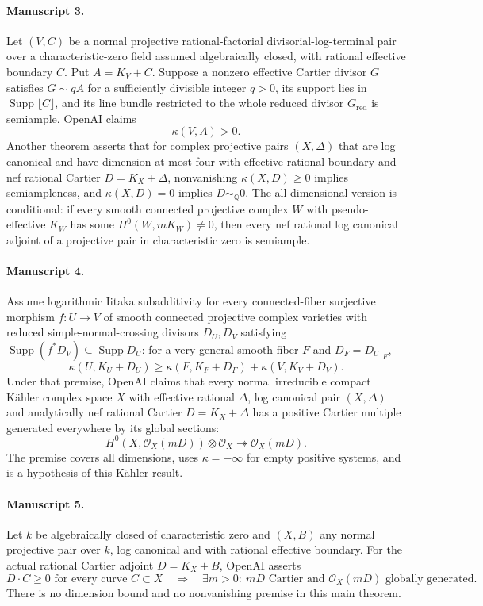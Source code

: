\documentclass[11pt]{article}
\begin{document}
\paragraph{Manuscript 3.}
Let $(V,C)$ be a normal projective rational-factorial divisorial-log-terminal pair over a characteristic-zero field assumed algebraically closed, with rational effective boundary $C$. Put $A=K_V+C$. Suppose a nonzero effective Cartier divisor $G$ satisfies $G\sim qA$ for a sufficiently divisible integer $q>0$, its support lies in $\operatorname{Supp}\lfloor C\rfloor$, and its line bundle restricted to the whole reduced divisor $G_{\mathrm{red}}$ is semiample. OpenAI claims
\[
\kappa(V,A)>0.
\]
Another theorem asserts that for complex projective pairs $(X,\Delta)$ that are log canonical and have dimension at most four with effective rational boundary and nef rational Cartier $D=K_X+\Delta$, nonvanishing $\kappa(X,D)\ge0$ implies semiampleness, and $\kappa(X,D)=0$ implies $D\sim_{\mathbb Q}0$.
The all-dimensional version is conditional: if every smooth connected projective complex $W$ with pseudo-effective $K_W$ has some $H^0(W,mK_W)\ne0$, then every nef rational log canonical adjoint of a projective pair in characteristic zero is semiample.

\paragraph{Manuscript 4.}
Assume logarithmic Iitaka subadditivity for every connected-fiber surjective morphism $f:U\to V$ of smooth connected projective complex varieties with reduced simple-normal-crossing divisors $D_U,D_V$ satisfying $\operatorname{Supp}(f^*D_V)\subseteq\operatorname{Supp}D_U$: for a very general smooth fiber $F$ and $D_F=D_U|_F$,
\[
\kappa(U,K_U+D_U)\ge\kappa(F,K_F+D_F)+\kappa(V,K_V+D_V).
\]
Under that premise, OpenAI claims that every normal irreducible compact Kähler complex space $X$ with effective rational $\Delta$, log canonical pair $(X,\Delta)$ and analytically nef rational Cartier $D=K_X+\Delta$ has a positive Cartier multiple generated everywhere by its global sections:
\[
H^0(X,\mathcal O_X(mD))\otimes\mathcal O_X\twoheadrightarrow\mathcal O_X(mD).
\]
The premise covers all dimensions, uses $\kappa=-\infty$ for empty positive systems, and is a hypothesis of this Kähler result.

\paragraph{Manuscript 5.}
Let $k$ be algebraically closed of characteristic zero and $(X,B)$ any normal projective pair over $k$, log canonical and with rational effective boundary. For the actual rational Cartier adjoint $D=K_X+B$, OpenAI asserts
\[
D\cdot C\ge0\text{ for every curve }C\subset X
\quad\Longrightarrow\quad
\exists m>0:\ mD\text{ Cartier and }\mathcal O_X(mD)\text{ globally generated}.
\]
There is no dimension bound and no nonvanishing premise in this main theorem.
\end{document}
